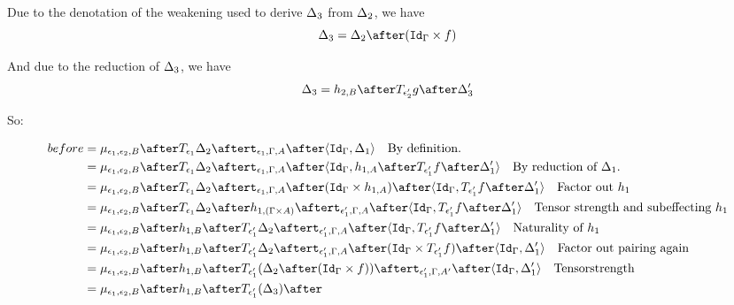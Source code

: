 \documentclass{report}
\begin{document}
                Due to the denotation of the weakening used to derive $\Delta_3$ from $\Delta_2$, we have 
                \begin{equation}
                    \D_3 = \D_2\after(\idg\times f)
                \end{equation}

                And due to the reduction of $\Delta_3$,
                we have 
                \begin{equation}
                    \D_3 = h_{2, B} \after \T{\e_2'}{g}\after \D_3'
                \end{equation}

                So:

                \begin{align*}
                    before &= \bind{\e_1}{\e_2}{B}\after \T{\e_1}{\D_2}\after\tstrength{\e_1}{\G}{A}\after\pr{\idg}{\D_1}\qt{By definition.}\\
                    &= \bind{\e_1}{\e_2}{B}\after \T{\e_1}{\D_2}\after\tstrength{\e_1}{\G}{A}\after\pr{\idg}{h_{1, A}\after\T{\e_1'}{f}\after\D_1'}\qt{By reduction of $\D_1$.}\\
                    &= \bind{\e_1}{\e_2}{B}\after \T{\e_1}{\D_2}\after\tstrength{\e_1}{\G}{A}\after(\idg\times h_{1, A})\after\pr{\idg}{\T{\e_1'}{f}\after\D_1'}\qt{Factor out $h_1$}\\
                    &= \bind{\e_1}{\e_2}{B}\after \T{\e_1}{\D_2}\after
                    h_{1, (\G\times A)}\after
                    \tstrength{\e_1'}{\G}{A}\after\pr{\idg}{\T{\e_1'}{f}\after\D_1'}\qt{Tensor strength and subeffecting $h_1$}\\
                    &= \bind{\e_1}{\e_2}{B}\after 
                    h_{1, B}\after\T{\e_1'}{\D_2}\after
                    \tstrength{\e_1'}{\G}{A}\after\pr{\idg}{\T{\e_1'}{f}\after\D_1'}\qt{Naturality of $h_1$}\\
                    &= \bind{\e_1}{\e_2}{B}\after 
                    h_{1, B}\after\T{\e_1'}{\D_2}\after
                    \tstrength{\e_1'}{\G}{A}\after(\idg\times \T{\e_1'}{f})\after\pr{\idg}{\D_1'}\qt{Factor out pairing again}\\
                    &= \bind{\e_1}{\e_2}{B}\after 
                    h_{1, B}\after\T{\e_1'}{(\D_2\after(\idg\times f))}\after
                    \tstrength{\e_1'}{\G}{A'}\after\pr{\idg}{\D_1'}\qt{Tensorstrength}\\
                    &= \bind{\e_1}{\e_2}{B}\after 
                    h_{1, B}\after\T{\e_1'}{(\D_3)}\after

\end{align*}
\end{document}
